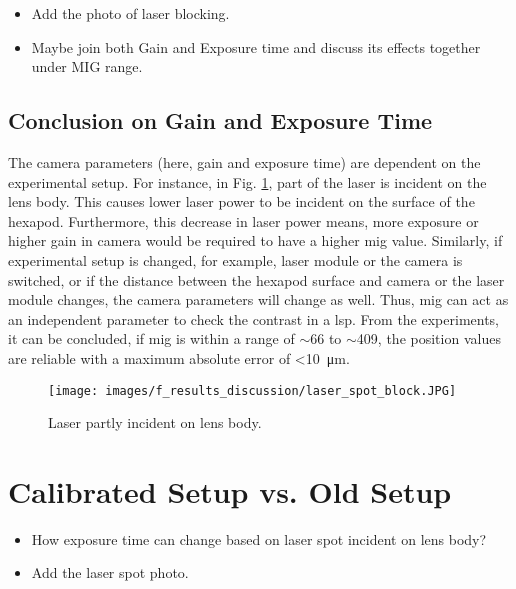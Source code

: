 \begin{itemize}
    \item Add the photo of laser blocking.
    \item Maybe join both Gain and Exposure time and discuss its effects together under MIG range.
\end{itemize}

\clearpage

\subsection*{Conclusion on Gain and Exposure Time}
The camera parameters (here, gain and exposure time) are dependent on the experimental setup. For instance, in Fig. \ref{fig:laser_spot_block.JPG}, part of the laser is incident on the lens body. This causes lower laser power to be incident on the surface of the hexapod. Furthermore, this decrease in laser power means, more exposure or higher gain in camera would be required to have a higher \gls{mig} value. Similarly, if experimental setup is changed, for example, laser module or the camera is switched, or if the distance between the hexapod surface and camera or the laser module changes, the camera parameters will change as well. Thus, \gls{mig} can act as an independent parameter to check the contrast in a \gls{lsp}. From the experiments, it can be concluded, if \gls{mig} is within a range of $\sim$66 to $\sim$409, the position values are reliable with a maximum absolute error of <\SI{10}{\micro\meter}.

\vspace{5mm}

\begin{figure}[h]
    \centering
    \texttt{[image: images/f\_results\_discussion/laser\_spot\_block.JPG]}
    \caption{Laser partly incident on lens body.}
    \label{fig:laser_spot_block.JPG}
\end{figure}

\clearpage

\section{Calibrated Setup vs. Old Setup}
\begin{itemize}
    \item How exposure time can change based on laser spot incident on lens body?
    \item Add the laser spot photo.
\end{itemize}

